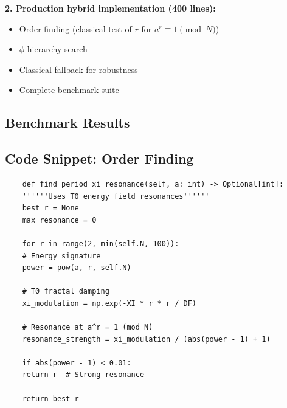 \textbf{2. Production hybrid implementation (400 lines):}
\begin{itemize}
	\item Order finding (classical test of $r$ for $a^r \equiv 1 \pmod{N}$)
	\item $\phi$-hierarchy search
	\item Classical fallback for robustness
	\item Complete benchmark suite
\end{itemize}

\subsection{Benchmark Results}

\begin{table}[h]
	\centering
	\caption{T0-Shor performance on benchmark suite}
	\label{tab:benchmark}
\end{table}

\subsection{Code Snippet: Order Finding}

\begin{lstlisting}
	def find_period_xi_resonance(self, a: int) -> Optional[int]:
	''''''Uses T0 energy field resonances''''''
	best_r = None
	max_resonance = 0
	
	for r in range(2, min(self.N, 100)):
	# Energy signature
	power = pow(a, r, self.N)
	
	# T0 fractal damping
	xi_modulation = np.exp(-XI * r * r / DF)
	
	# Resonance at a^r = 1 (mod N)
	resonance_strength = xi_modulation / (abs(power - 1) + 1)
	
	if abs(power - 1) < 0.01:
	return r  # Strong resonance
	
	return best_r
\end{lstlisting}

